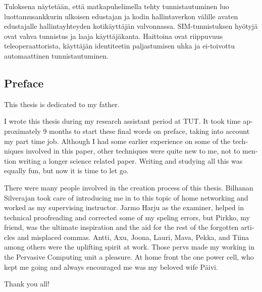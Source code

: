 \documentclass[12pt,a4paper,english]{tutthesis}
\begin{document}
\begin{otherlanguage}{finnish}
Tuloksena näytetään, että matkapuhelimella tehty tunnistautuminen luo 
luottamusankkurin ulkoisen edustajan ja kodin hallintaverkon välille avaten edustajalle hallintayhteyden kotikäyttäjän valvonnassa.
SIM-tunnistuksen hyötyjä ovat vahva tunnistus
 ja laaja  käyttäjäkanta. Haittoina ovat
 riippuvuus teleoperaattorista, käyttäjän identiteetin
paljastumisen uhka ja ei-toivottu automaattinen tunnistautuminen.
\end{otherlanguage}

\begin{otherlanguage}{english} %
\makeatother %

%
%
\chapter*{Preface}

This thesis is dedicated to my father. 


I wrote this thesis during my research assistant period at TUT.
It took time approximately 9 months to start these final words on preface,
taking into account my part time job.
Although I had some earlier experience on some of the techniques involved in this paper, 
other techniques were quite new to me, not to mention writing a longer
science related paper. Writing and studying all this was equally fun,
but now it is time to let go.

There were many people involved in the creation process of this thesis.
Bilhanan Silverajan took care of introducing me in to  this topic of 
home networking and worked as my supervising instructor. 
Jarmo Harju as the examiner, helped in technical proofreading and
corrected some of my speling errors, but Pirkko, my friend,  was the ultimate inspiration
and the aid for the rest of the forgotten articles and misplaced commas. 
Antti, Axu, Joona, Lauri, Mava, Pekka,  and Tiina among others were
the uplifting spirit at work. 
Those pervs made my working in the Pervasive Computing unit a pleasure.
At home front the one power cell, who kept me going and always encouraged me
was my beloved wife Päivi.

Thank you all!


\end{otherlanguage}
\end{document}
